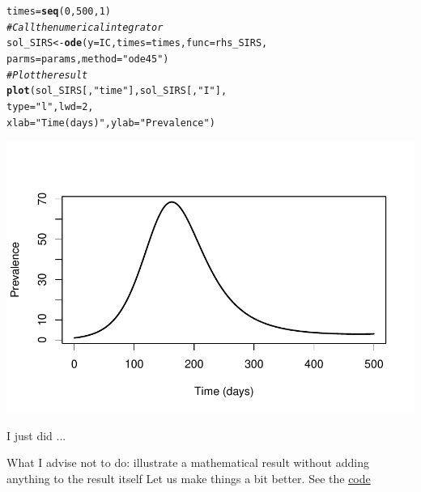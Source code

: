 \documentclass[aspectratio=169]{beamer}\usepackage[]{graphicx}\usepackage[]{xcolor}
\makeatletter
\newcommand{\hlnum}[1]{\textcolor[rgb]{0.686,0.059,0.569}{#1}}%
\newcommand{\hlsng}[1]{\textcolor[rgb]{0.192,0.494,0.8}{#1}}%
\newcommand{\hlcom}[1]{\textcolor[rgb]{0.678,0.584,0.686}{\textit{#1}}}%
\newcommand{\hldef}[1]{\textcolor[rgb]{0.345,0.345,0.345}{#1}}%
\newcommand{\hlkwb}[1]{\textcolor[rgb]{0.69,0.353,0.396}{#1}}%
\newcommand{\hlkwc}[1]{\textcolor[rgb]{0.333,0.667,0.333}{#1}}%
\newcommand{\hlkwd}[1]{\textcolor[rgb]{0.737,0.353,0.396}{\textbf{#1}}}%
\newenvironment{kframe}{%
 \def\at@end@of@kframe{}%
 \ifinner\ifhmode%
  \def\at@end@of@kframe{\end{minipage}}%
  \begin{minipage}{\columnwidth}%
 \fi\fi%
 \def\FrameCommand##1{\hskip\@totalleftmargin \hskip-\fboxsep
 \colorbox{shadecolor}{##1}\hskip-\fboxsep
     \hskip-\linewidth \hskip-\@totalleftmargin \hskip\columnwidth}%
 \MakeFramed {\advance\hsize-\width
   \@totalleftmargin\z@ \linewidth\hsize
   \@setminipage}}%
 {\par\unskip\endMakeFramed%
 \at@end@of@kframe}
\newenvironment{knitrout}{}{} %
\makeatother
\begin{document}
\begin{knitrout}
\begin{kframe}
\begin{alltt}
\hldef{times} \hlkwb{=} \hlkwd{seq}\hldef{(}\hlnum{0}\hldef{,} \hlnum{500}\hldef{,} \hlnum{1}\hldef{)}
\hlcom{# Call the numerical integrator}
\hldef{sol_SIRS} \hlkwb{<-} \hlkwd{ode}\hldef{(}\hlkwc{y} \hldef{= IC,} \hlkwc{times} \hldef{= times,} \hlkwc{func} \hldef{= rhs_SIRS,}
                \hlkwc{parms} \hldef{= params,} \hlkwc{method} \hldef{=} \hlsng{"ode45"}\hldef{)}
\hlcom{# Plot the result}
\hlkwd{plot}\hldef{(sol_SIRS[,}\hlsng{"time"}\hldef{], sol_SIRS[,}\hlsng{"I"}\hldef{],}
     \hlkwc{type} \hldef{=} \hlsng{"l"}\hldef{,} \hlkwc{lwd} \hldef{=} \hlnum{2}\hldef{,}
     \hlkwc{xlab} \hldef{=} \hlsng{"Time (days)"}\hldef{,} \hlkwc{ylab} \hldef{=} \hlsng{"Prevalence"}\hldef{)}
\end{alltt}
\end{kframe}
\end{knitrout}

\begin{frame}{}
  \begin{center}
    \includegraphics[width=\textwidth]{FIGS/course-01-SIRS_one_sim_prevalence-1.pdf}
  \end{center}
\end{frame}

\begin{frame}{I just did ...}

What I advise not to do: illustrate a mathematical result without adding anything to the result itself
\vfill
Let us make things a bit better. See the \href{https://raw.githubusercontent.com/julien-arino/3MC-2023-12-Arba-Minch/main/CODE/ODE_SIS_multiple_solutions.R}{code}
\end{frame}
\end{document}
